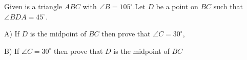 Given is a triangle $ABC$ with $\angle{B}=105^{\circ}$.Let $D$ be a point on $BC$ such that $\angle{BDA}=45^{\circ}$.

A) If $D$ is the midpoint of $BC$ then prove that $\angle{C}=30^{\circ}$, 

B) If $\angle{C}=30^{\circ}$ then prove that $D$ is the midpoint of $BC$